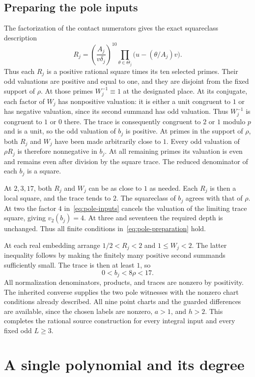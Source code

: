 \documentclass[11pt,a4paper]{article}
\begin{document}
\subsection{Preparing the pole inputs}

The factorization of the contact numerators gives the exact squareclass
description
\[
 R_j=\left(\frac{A_j}{v\delta_j}\right)^{10}
                  \prod_{\theta\in\Theta_j}
                    \bigl(u-(\theta/A_j)v\bigr).
\]
Thus each $R_j$ is a positive rational square times its ten selected
primes. Their odd valuations are positive and equal to one, and they
are disjoint from the fixed support of $\rho$. At those primes
$W_j^{-1}\equiv1$ at the designated place. At its conjugate,
each factor of $W_j$ has nonpositive valuation: it is either a
unit congruent to $1$ or has negative valuation, since its second
summand has odd valuation. Thus $W_j^{-1}$ is congruent to $1$
or $0$ there. The trace is consequently congruent to $2$ or $1$
modulo $p$ and is a unit, so the odd valuation of $b_j$ is positive.
At primes in the support of
$\rho$, both $R_j$ and $W_j$ have been made arbitrarily close
to $1$. Every odd valuation of $\rho R_j$ is therefore nonnegative
in $b_j$. At all remaining primes its valuation is even and remains
even after division by the square trace. The reduced denominator
of each $b_j$ is a square.

At $2,3,17$, both $R_j$ and $W_j$ can be as close to $1$ as
needed. Each $R_j$ is then a local square, and the trace tends
to $2$. The squareclass of $b_j$ agrees with that of $\rho$.
At two the factor $4$ in~\eqref{eq:pole-inputs} cancels the
valuation of the limiting trace square, giving $v_2(b_j)=4$.
At three and seventeen the required depth is unchanged. Thus
all finite conditions in~\eqref{eq:pole-preparation} hold.

At each real embedding arrange $1/2<R_j<2$ and $1\le W_j<2$.
The latter inequality follows by making the finitely many positive
second summands sufficiently small. The trace is then at least
$1$, so
\[
                         0<b_j<8\rho<17.
\]
All normalization denominators, products, and traces are nonzero
by positivity. The inherited converse supplies the two pole witnesses
with the nonzero chart conditions already described. All nine point
charts and the guarded differences are available, since the chosen
labels are nonzero, $a>1$, and $h>2$. This completes the rational
source construction for every integral input and every fixed odd
$L\ge3$.

\section{A single polynomial and its degree}
\end{document}

